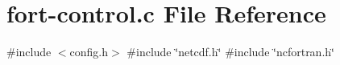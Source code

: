 \hypertarget{fort-control_8c}{}\section{fort-\/control.c File Reference}
\label{fort-control_8c}
{\ttfamily \#include $<$config.\+h$>$}\newline
{\ttfamily \#include \char`\"{}netcdf.\+h\char`\"{}}\newline
{\ttfamily \#include \char`\"{}ncfortran.\+h\char`\"{}}\newline
